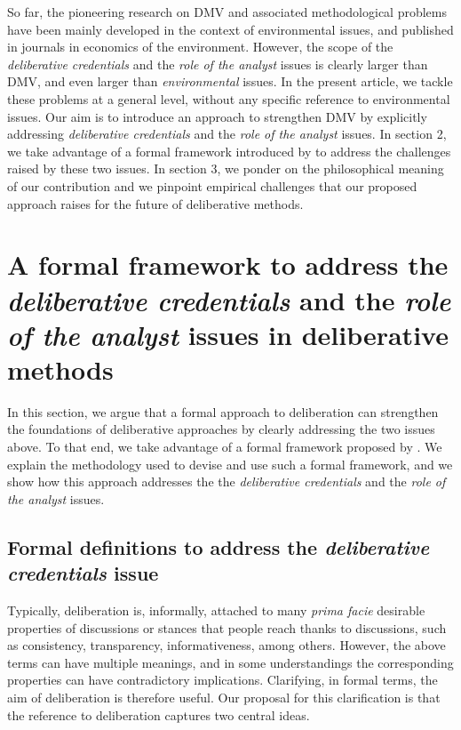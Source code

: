 \documentclass[version=3.21, pagesize, twoside=off, bibliography=totoc, DIV=calc, fontsize=12pt, a4paper, french, english]{scrartcl}
\begin{document}
So far, the pioneering research on \ac{DMV} and associated methodological problems have been mainly developed in the context of environmental issues, and published in journals in economics of the environment. However, the scope of the \emph{deliberative credentials} and the \emph{role of the analyst} issues is clearly larger than \ac{DMV}, and even larger than \emph{environmental} issues. In the present article, we tackle these problems at a general level, without any specific reference to environmental issues. Our aim is to introduce an approach to strengthen \ac{DMV} by explicitly addressing \emph{deliberative credentials} and the \emph{role of the analyst} issues. In section 2, we take advantage of a formal framework introduced by \citet{cailloux_formal_2019} to address the challenges raised by these two issues.
In section 3, we ponder on the philosophical meaning of our contribution and we pinpoint empirical challenges that our proposed approach raises for the future of deliberative methods.

\section{A formal framework to address the \emph{deliberative credentials} and the \emph{role of the analyst} issues in deliberative methods}
In this section, we argue that a formal approach to deliberation can strengthen the foundations of deliberative approaches by clearly addressing the two issues above. To that end, we take advantage of a formal framework proposed by \citet{cailloux_formal_2019}. We explain the methodology used to devise and use such a formal framework, and we show how this approach addresses the the \emph{deliberative credentials} and the \emph{role of the analyst} issues.

\subsection{Formal definitions to address the \emph{deliberative credentials} issue}

Typically, deliberation is, informally, attached to many \emph{prima facie} desirable properties of discussions or stances that people reach thanks to discussions, such as consistency, transparency, informativeness, among others. However, the above terms can have multiple meanings, and in some understandings the corresponding properties can have contradictory implications. Clarifying, in formal terms, the aim of deliberation is therefore useful. Our proposal for this clarification is that the reference to deliberation captures two central ideas.
\end{document}
